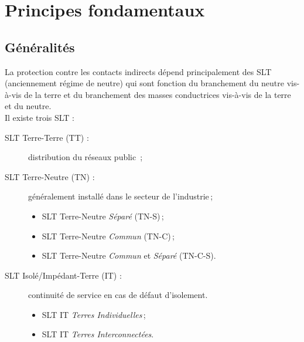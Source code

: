 

\begin{comment}

\documentclass[a4paper, 11pt, twoside, fleqn]{memoir}

\usepackage{AOCDTF}

\marqueurchapitre %


	\openleft %

\end{comment}

\chapter{Principes fondamentaux}
\ChapFrame
 
\section{Généralités}

La protection contre les contacts indirects dépend principalement des SLT (anciennement régime de neutre) qui sont fonction du branchement du neutre vis-à-vis de la terre et du branchement des masses conductrices vis-à-vis de la terre et du neutre.\\
Il existe trois SLT :
\begin{description}
\item[SLT Terre-Terre (TT) :] distribution du réseaux public \,;
\item[SLT Terre-Neutre (TN) :] généralement installé dans le secteur de l'industrie\,;
\begin{itemize}
\item SLT Terre-Neutre \emph{Séparé} (TN-S)\,;
\item SLT Terre-Neutre \emph{Commun} (TN-C)\,;
\item SLT Terre-Neutre \emph{Commun} et \emph{Séparé} (TN-C-S).
\end{itemize}
\item[SLT Isolé/Impédant-Terre (IT) :] continuité de service en cas de défaut d'isolement.
\begin{itemize}
\item SLT IT \emph{Terres Individuelles}\,;
\item SLT IT \emph{Terres Interconnectées}.
\end{itemize}
\end{description}

